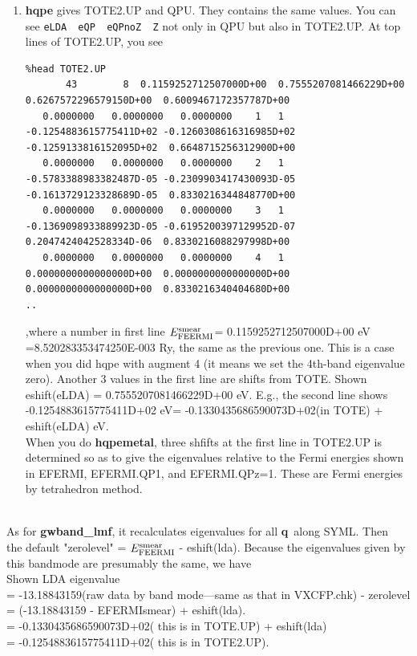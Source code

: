 \documentclass[a4paper,10pt,epsf,fleqn]{article}
\newcommand{\bfq}{{\bf q}}
\newcommand{\exe}[1]{{\bf #1}}
\newcommand{\io}[1]{{\sf  #1}}
\begin{document}
{\begin{enumerate}
\item
\exe{hqpe} gives \io{TOTE2.UP} and \io{QPU}. 
They contains the same values. You can see  
\verb#eLDA  eQP  eQPnoZ  Z# not only in \io{QPU} but also in \io{TOTE2.UP}.
At top lines of \io{TOTE2.UP}, you see  
{\baselineskip=3mm \small
\begin{verbatim}
%head TOTE2.UP
       43        8  0.1159252712507000D+00  0.7555207081466229D+00  0.6267572296579150D+00  0.6009467172357787D+00
   0.0000000   0.0000000   0.0000000    1   1  -0.1254883615775411D+02 -0.1260308616316985D+02 -0.1259133816152095D+02  0.6648715256312900D+00
   0.0000000   0.0000000   0.0000000    2   1  -0.5783388983382487D-05 -0.2309903417430093D-05 -0.1613729123328689D-05  0.8330216344848770D+00
   0.0000000   0.0000000   0.0000000    3   1  -0.1369098933889923D-05 -0.6195200397129952D-07  0.2047424042528334D-06  0.8330216088297998D+00
   0.0000000   0.0000000   0.0000000    4   1   0.0000000000000000D+00  0.0000000000000000D+00  0.0000000000000000D+00  0.8330216340404680D+00
..
\end{verbatim}}
,where a number in first line $E_{\rm FEERMI}^{\rm smear}$= 
0.1159252712507000D+00 eV =8.520283353474250E-003 Ry,
the same as the previous one.
This is a case when you did hqpe with augment 4 
(it means we set the 4th-band eigenvalue zero).
Another 3 values in the first line are shifts from \io{TOTE}.
Shown eshift(eLDA) = 0.7555207081466229D+00 eV.
E.g., the second line shows\\
-0.1254883615775411D+02 eV= -0.1330435686590073D+02(in TOTE) + eshift(eLDA) eV.\\

When you do \exe{hqpemetal}, three shfifts at the first line in \io{TOTE2.UP}
is determined so as to give the eigenvalues relative to the Fermi
energies shown in \io{EFERMI}, \io{EFERMI.QP1}, and \io{EFERMI.QPz=1}. 
These are Fermi energies by tetrahedron method.

\end{enumerate}

~\\

As for {\bf gwband\_lmf}, it recalculates eigenvalues for all \bfq \ along SYML.
Then\\ the default "zerolevel" = $E_{\rm FEERMI}^{\rm smear}$ - eshift(lda). 
Because the eigenvalues given by this bandmode are presumably the same, we have\\
Shown LDA eigenvalue\\
 =  -13.18843159(raw data by band mode---same as that in VXCFP.chk) - zerolevel\\
 = (-13.18843159 - EFERMIsmear) + eshift(lda).\\
 =  -0.1330435686590073D+02( this is in TOTE.UP) + eshift(lda)\\
 =  -0.1254883615775411D+02( this is in TOTE2.UP).\\

}
\end{document}
